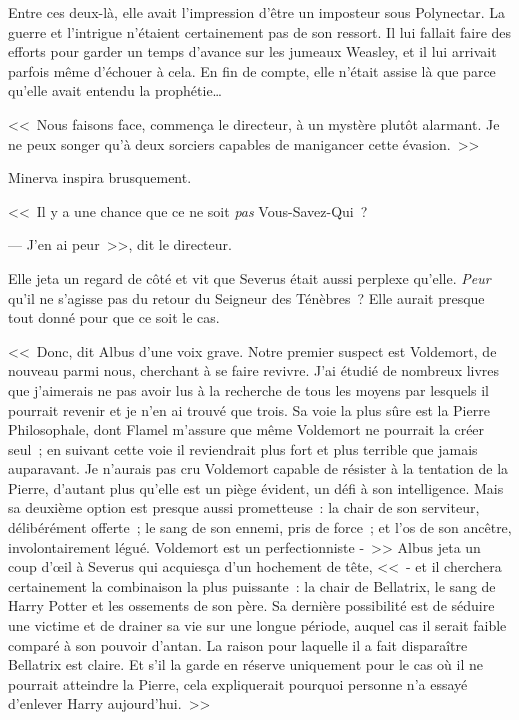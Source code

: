 Entre ces deux-là, elle avait l'impression d'être un imposteur sous Polynectar. La guerre et l'intrigue n'étaient certainement pas de son ressort. Il lui fallait faire des efforts pour garder un temps d'avance sur les jumeaux Weasley, et il lui arrivait parfois même d'échouer à cela. En fin de compte, elle n'était assise là que parce qu'elle avait entendu la prophétie…

<<~Nous faisons face, commença le directeur, à un mystère plutôt alarmant. Je ne peux songer qu'à deux sorciers capables de manigancer cette évasion.~>>

Minerva inspira brusquement.

<<~Il y a une chance que ce ne soit \emph{pas} Vous-Savez-Qui~?

--- J'en ai peur~>>, dit le directeur.

Elle jeta un regard de côté et vit que Severus était aussi perplexe qu'elle. \emph{Peur} qu'il ne s'agisse pas du retour du Seigneur des Ténèbres~? Elle aurait presque tout donné pour que ce soit le cas.

<<~Donc, dit Albus d'une voix grave. Notre premier suspect est Voldemort, de nouveau parmi nous, cherchant à se faire revivre. J'ai étudié de nombreux livres que j'aimerais ne pas avoir lus à la recherche de tous les moyens par lesquels il pourrait revenir et je n'en ai trouvé que trois. Sa voie la plus sûre est la Pierre Philosophale, dont Flamel m'assure que même Voldemort ne pourrait la créer seul~; en suivant cette voie il reviendrait plus fort et plus terrible que jamais auparavant. Je n'aurais pas cru Voldemort capable de résister à la tentation de la Pierre, d'autant plus qu'elle est un piège évident, un défi à son intelligence. Mais sa deuxième option est presque aussi prometteuse~: la chair de son serviteur, délibérément offerte~; le sang de son ennemi, pris de force~; et l'os de son ancêtre, involontairement légué. Voldemort est un perfectionniste -~>> Albus jeta un coup d'œil à Severus qui acquiesça d'un hochement de tête, <<~- et il cherchera certainement la combinaison la plus puissante~: la chair de Bellatrix, le sang de Harry Potter et les ossements de son père. Sa dernière possibilité est de séduire une victime et de drainer sa vie sur une longue période, auquel cas il serait faible comparé à son pouvoir d'antan. La raison pour laquelle il a fait disparaître Bellatrix est claire. Et s'il la garde en réserve uniquement pour le cas où il ne pourrait atteindre la Pierre, cela expliquerait pourquoi personne n'a essayé d'enlever Harry aujourd'hui.~>>

